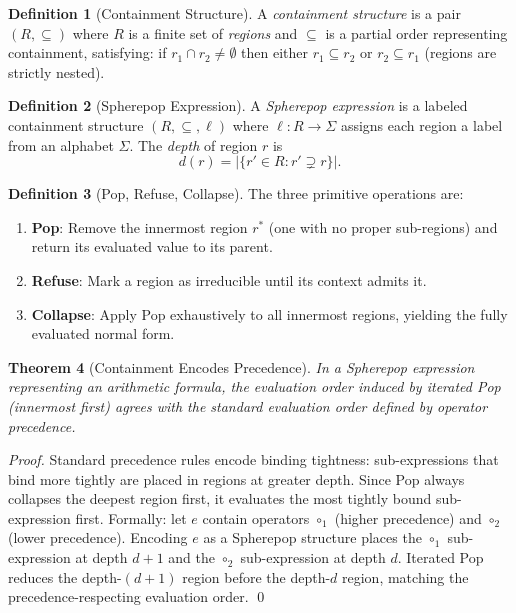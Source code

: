 \documentclass[12pt, a4paper, twoside]{article}
\theoremstyle{plain}
\newtheorem{theorem}{Theorem}[section]
\theoremstyle{definition}
\newtheorem{definition}[theorem]{Definition}
\theoremstyle{remark}
\begin{document}
\begin{definition}[Containment Structure]
A \emph{containment structure} is a pair $(R, \subseteq)$ where $R$ is a
finite set of \emph{regions} and $\subseteq$ is a partial order representing
containment, satisfying: if $r_1 \cap r_2 \neq \emptyset$ then either
$r_1 \subseteq r_2$ or $r_2 \subseteq r_1$ (regions are strictly nested).
\end{definition}

\begin{definition}[Spherepop Expression]
A \emph{Spherepop expression} is a labeled containment structure
$(R, \subseteq, \ell)$ where $\ell: R \to \Sigma$ assigns each region a label
from an alphabet $\Sigma$. The \emph{depth} of region $r$ is
\[
  d(r) = |\{r' \in R : r' \supsetneq r\}|.
\]
\end{definition}

\begin{definition}[Pop, Refuse, Collapse]
The three primitive operations are:
\begin{enumerate}[label=(\roman*)]
  \item \textbf{Pop}: Remove the innermost region $r^*$ (one with no proper
    sub-regions) and return its evaluated value to its parent.
  \item \textbf{Refuse}: Mark a region as irreducible until its context
    admits it.
  \item \textbf{Collapse}: Apply Pop exhaustively to all innermost regions,
    yielding the fully evaluated normal form.
\end{enumerate}
\end{definition}

\begin{theorem}[Containment Encodes Precedence]
\label{thm:containment_precedence}
In a Spherepop expression representing an arithmetic formula, the evaluation
order induced by iterated Pop (innermost first) agrees with the standard
evaluation order defined by operator precedence.
\end{theorem}

\begin{proof}
Standard precedence rules encode binding tightness: sub-expressions that bind
more tightly are placed in regions at greater depth. Since Pop always collapses
the deepest region first, it evaluates the most tightly bound sub-expression
first. Formally: let $e$ contain operators $\circ_1$ (higher precedence) and
$\circ_2$ (lower precedence). Encoding $e$ as a Spherepop structure places the
$\circ_1$ sub-expression at depth $d+1$ and the $\circ_2$ sub-expression at
depth $d$. Iterated Pop reduces the depth-$(d+1)$ region before the depth-$d$
region, matching the precedence-respecting evaluation order.
\qed
\end{proof}
\end{document}
